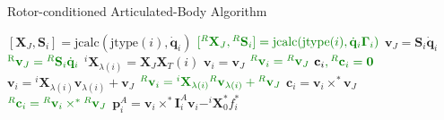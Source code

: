 \clearpage
\begin{algorithm}
    \caption{Rotor-conditioned Articulated-Body Algorithm}
    \label{alg:rotaba}
    \begin{algorithmic}[1]
        \STATE $[\mathbf{X}_J, \mathbf{S}_i] = \text{jcalc}(\text{jtype}(i), \dot{\mathbf{q}}_i)$
        \STATE $\color{webgreen}{[{} ^R\mathbf{X}_J, {} ^R\mathbf{S}_i] = \text{jcalc}(\text{jtype}(i), \dot{\mathbf{q}}_i \boldsymbol{\Gamma} _i)}$
        \STATE $\mathrm{\mathbf{v}}_J = \mathbf{S}_i \dot{\mathbf{q}}_i$
        \STATE $\color{webgreen}{\mathrm{{} ^R\mathbf{v}}_J = {} ^R\mathbf{S}_i \dot{\mathbf{q}}_i}$
        \STATE $^i\mathbf{X}_{\lambda(i)} = \mathbf{X}_J\mathbf{X}_T (i)$
        \STATE $\mathrm{\mathbf{v}}_i = \mathrm{\mathbf{v}}_J$
        \STATE $\color{webgreen}{{}^R\mathrm{\mathbf{v}}_i = {}^R\mathrm{\mathbf{v}}_J}$
        \STATE $\mathbf{c}_i \color{webgreen}{,{}^R\mathbf{c}_i} = \mathbf{0}$
        \ELSE
        \STATE $\mathrm{\mathbf{v}}_i = {}^i\mathbf{X} _{\lambda(i)}\mathrm{\mathbf{v}}_{\lambda(i)} + \mathrm{\mathbf{v}}_J$
        \STATE $\color{webgreen}{{}^R\mathrm{\mathbf{v}}_i =  {}^i\mathbf{X} _{\lambda(i)} {}^R\mathrm{\mathbf{v}}_{\lambda(i)} + {}^R\mathrm{\mathbf{v}}_J}$
        \STATE $\mathbf{c}_i = \mathrm{\mathbf{v}}_i \times ^* \mathrm{\mathbf{v}}_J$
        \STATE $\color{webgreen}{{}^R\mathbf{c}_i = {}^R\mathrm{\mathbf{v}}_i \times ^* {}^R\mathrm{\mathbf{v}}_J}$
        \ENDIF
        \STATE $\mathbf{p}_i ^A = \mathrm{\mathbf{v}}_i \times^* \mathbf{I}_i ^A \mathrm{\mathbf{v}}_i - ^i\mathbf{X} _0 ^* f ^* _i $
        \STATE {}
        \ENDFOR


\end{algorithmic}
\end{algorithm}
